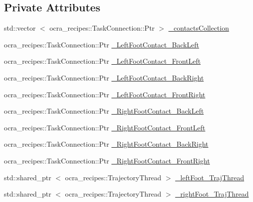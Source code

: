 \subsection*{\-Private \-Attributes}
\begin{DoxyCompactItemize}
\item 
std\-::vector\*
$<$ ocra\-\_\-recipes\-::\-Task\-Connection\-::\-Ptr $>$ \hyperlink{classStepController_aabeb4837b7b6cf691cb9de57c6ea8800}{\-\_\-contacts\-Collection}
\item 
ocra\-\_\-recipes\-::\-Task\-Connection\-::\-Ptr \hyperlink{classStepController_ad778378c6e6ac12d972cc8c5a986dcf9}{\-\_\-\-Left\-Foot\-Contact\-\_\-\-Back\-Left}
\item 
ocra\-\_\-recipes\-::\-Task\-Connection\-::\-Ptr \hyperlink{classStepController_a74e19501ce4f336bb4c26beebe3d39e2}{\-\_\-\-Left\-Foot\-Contact\-\_\-\-Front\-Left}
\item 
ocra\-\_\-recipes\-::\-Task\-Connection\-::\-Ptr \hyperlink{classStepController_a9c733b7ab0ce610c84158f7d1de60267}{\-\_\-\-Left\-Foot\-Contact\-\_\-\-Back\-Right}
\item 
ocra\-\_\-recipes\-::\-Task\-Connection\-::\-Ptr \hyperlink{classStepController_a1a4e831d573ab9e0f25680da7d065a77}{\-\_\-\-Left\-Foot\-Contact\-\_\-\-Front\-Right}
\item 
ocra\-\_\-recipes\-::\-Task\-Connection\-::\-Ptr \hyperlink{classStepController_a57947ee8824b3cb3ee34e936431588df}{\-\_\-\-Right\-Foot\-Contact\-\_\-\-Back\-Left}
\item 
ocra\-\_\-recipes\-::\-Task\-Connection\-::\-Ptr \hyperlink{classStepController_a0e1c5ce837e4811214a97c42edc66721}{\-\_\-\-Right\-Foot\-Contact\-\_\-\-Front\-Left}
\item 
ocra\-\_\-recipes\-::\-Task\-Connection\-::\-Ptr \hyperlink{classStepController_ac999bb1e7b4b005da35093345c0cb4de}{\-\_\-\-Right\-Foot\-Contact\-\_\-\-Back\-Right}
\item 
ocra\-\_\-recipes\-::\-Task\-Connection\-::\-Ptr \hyperlink{classStepController_a9f06562625b657c280dc688bcad421be}{\-\_\-\-Right\-Foot\-Contact\-\_\-\-Front\-Right}
\item 
std\-::shared\-\_\-ptr\*
$<$ ocra\-\_\-recipes\-::\-Trajectory\-Thread $>$ \hyperlink{classStepController_adc2b0bf2d3c302c54d659d44cb34ba3e}{\-\_\-left\-Foot\-\_\-\-Traj\-Thread}
\item 
std\-::shared\-\_\-ptr\*
$<$ ocra\-\_\-recipes\-::\-Trajectory\-Thread $>$ \hyperlink{classStepController_a37b943ed8733490d028687997944e478}{\-\_\-right\-Foot\-\_\-\-Traj\-Thread}

\end{DoxyCompactItemize}
